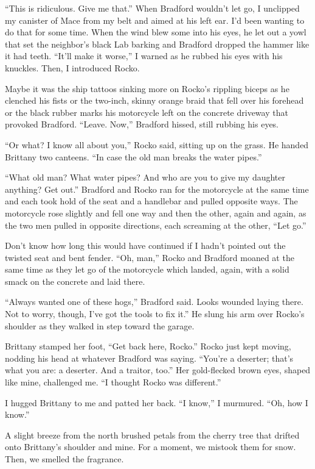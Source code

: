 \documentclass[
]{article}
\begin{document}
``This is ridiculous. Give me that.'' When Bradford wouldn't let go, I
unclipped my canister of Mace from my belt and aimed at his left ear.
I'd been wanting to do that for some time. When the wind blew some into
his eyes, he let out a yowl that set the neighbor's black Lab barking
and Bradford dropped the hammer like it had teeth. ``It'll make it
worse,'' I warned as he rubbed his eyes with his knuckles. Then, I
introduced Rocko.

Maybe it was the ship tattoos sinking more on Rocko's rippling biceps as
he clenched his fists or the two-inch, skinny orange braid that fell
over his forehead or the black rubber marks his motorcy­cle left on the
concrete driveway that provoked Bradford. ``Leave. Now,'' Bradford
hissed, still rubbing his eyes.

``Or what? I know all about you,'' Rocko said, sitting up on the grass.
He handed Brittany two canteens. ``In case the old man breaks the water
pipes.''

``What old man? What water pipes? And who are you to give my daughter
anything? Get out.'' Bradford and Rocko ran for the motorcycle at the
same time and each took hold of the seat and a handlebar and pulled
opposite ways. The motorcycle rose slightly and fell one way and then
the other, again and again, as the two men pulled in opposite
directions, each screaming at the other, ``Let go.''

Don't know how long this would have continued if I hadn't pointed out
the twisted seat and bent fender. ``Oh, man,'' Rocko and Bradford moaned
at the same time as they let go of the motorcy­cle which landed, again,
with a solid smack on the concrete and laid there.

``Always wanted one of these hogs,'' Bradford said. Looks wounded laying
there. Not to worry, though, I've got the tools to fix it.'' He slung
his arm over Rocko's shoulder as they walked in step toward the garage.

Brittany stamped her foot, ``Get back here, Rocko.'' Rocko just kept
moving, nodding his head at whatever Bradford was saying. ``You're a
deserter; that's what you are: a deserter. And a traitor, too.'' Her
gold-flecked brown eyes, shaped like mine, challenged me. ``I thought
Rocko was different.''

I hugged Brittany to me and patted her back. ``I know,'' I murmured.
``Oh, how I know.''

A slight breeze from the north brushed petals from the cherry tree that
drifted onto Brittany's shoulder and mine. For a moment, we mistook them
for snow. Then, we smelled the fragrance.
\end{document}
